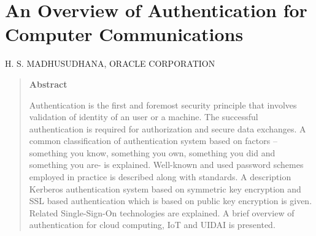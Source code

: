 \chapter*{An Overview of Authentication for Computer Communications}

\begin{center}
\uppercase{H. S. Madhusudhana, Oracle Corporation}
\end{center}

\bigskip

\begin{quotation}
\centerline{\bf Abstract}
\medskip

Authentication is the first and foremost security principle that involves validation of identity of an user or a machine. The successful authentication is required for authorization and secure data exchanges. A common classification of authentication system based on factors -- something you know, something you own, something you did and something you are- is explained. Well-known and used password schemes employed in practice is described along with standards. A description Kerberos authentication system based on symmetric key encryption and SSL based authentication which is based on public key encryption is given. Related Single-Sign-On technologies are explained. A brief overview of authentication for cloud computing, IoT and UIDAI is presented.
\end{quotation}

